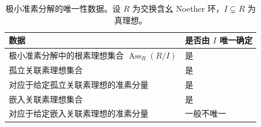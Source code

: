 \begin{table}[htbp]
	\centering
	\caption[极小准素分解的唯一性数据]{极小准素分解的唯一性数据。设 \(R\) 为交换含幺 Noether 环，\(I\subsetneq R\) 为真理想。}
	\label{b3:tab:primary-uniqueness-data}
	\begin{tabularx}{\textwidth}{@{}>{\raggedright\arraybackslash}X>{\raggedright\arraybackslash}p{}@{}}
		\toprule
		数据 & 是否由 \(I\) 唯一确定\\
		\midrule
		极小准素分解中的根素理想集合 \(\operatorname{Ass}_R(R/I)\) & 是\\
		孤立关联素理想集合 & 是\\
		对应于给定孤立关联素理想的准素分量 & 是\\
		嵌入关联素理想集合 & 是\\
		对应于给定嵌入关联素理想的准素分量 & 一般不唯一\\
		\bottomrule
	\end{tabularx}
\end{table}
